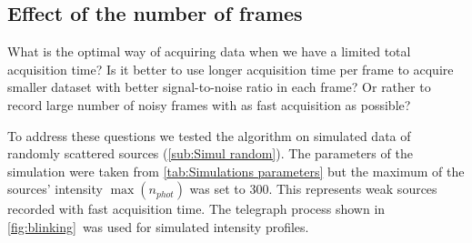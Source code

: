 \subsection{Effect of the number of frames\label{sub:results - number of frames}}
%

What is the optimal way of acquiring data when we have a limited total acquisition time? Is it better to use longer acquisition time per frame to acquire smaller dataset with better signal-to-noise ratio in each frame? Or rather to record large number of noisy frames with as fast acquisition as possible? 

To address these questions we tested the algorithm on simulated data of randomly scattered sources (\autoref{sub:Simul random}). The parameters of the simulation were taken from \autoref{tab:Simulations parameters} but the maximum of the sources' intensity $\max(n_{phot})$ was set to 300. This represents weak sources recorded with fast acquisition time. The telegraph process shown in \autoref{fig:blinking}\ccc\ was used for simulated intensity profiles. 


